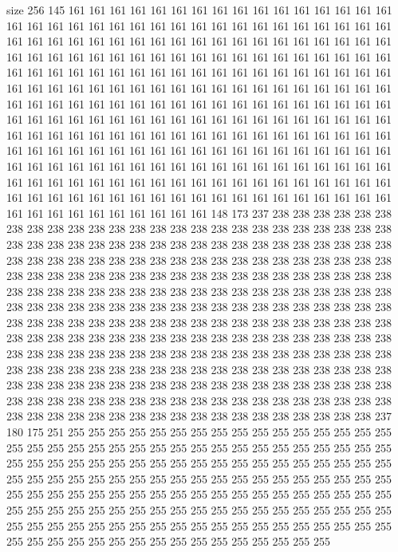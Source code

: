 size 256
145 161 161 161 161 161 161 161 161 161 161 161 161 161 161 161 161 161 161 161
161 161 161 161 161 161 161 161 161 161 161 161 161 161 161 161 161 161 161 161
161 161 161 161 161 161 161 161 161 161 161 161 161 161 161 161 161 161 161 161
161 161 161 161 161 161 161 161 161 161 161 161 161 161 161 161 161 161 161 161
161 161 161 161 161 161 161 161 161 161 161 161 161 161 161 161 161 161 161 161
161 161 161 161 161 161 161 161 161 161 161 161 161 161 161 161 161 161 161 161
161 161 161 161 161 161 161 161 161 161 161 161 161 161 161 161 161 161 161 161
161 161 161 161 161 161 161 161 161 161 161 161 161 161 161 161 161 161 161 161
161 161 161 161 161 161 161 161 161 161 161 161 161 161 161 161 161 161 161 161
161 161 161 161 161 161 161 161 161 161 161 161 161 161 161 161 161 161 161 161
161 161 161 161 161 161 161 161 161 161 161 161 161 161 161 161 161 161 161 161
161 161 161 161 161 161 161 161 161 161 161 161 161 161 161 161 161 161 161 161
161 161 161 161 161 161 161 161 161 161 161 161 161 161 161 148 173 237 238 238
238 238 238 238 238 238 238 238 238 238 238 238 238 238 238 238 238 238 238 238
238 238 238 238 238 238 238 238 238 238 238 238 238 238 238 238 238 238 238 238
238 238 238 238 238 238 238 238 238 238 238 238 238 238 238 238 238 238 238 238
238 238 238 238 238 238 238 238 238 238 238 238 238 238 238 238 238 238 238 238
238 238 238 238 238 238 238 238 238 238 238 238 238 238 238 238 238 238 238 238
238 238 238 238 238 238 238 238 238 238 238 238 238 238 238 238 238 238 238 238
238 238 238 238 238 238 238 238 238 238 238 238 238 238 238 238 238 238 238 238
238 238 238 238 238 238 238 238 238 238 238 238 238 238 238 238 238 238 238 238
238 238 238 238 238 238 238 238 238 238 238 238 238 238 238 238 238 238 238 238
238 238 238 238 238 238 238 238 238 238 238 238 238 238 238 238 238 238 238 238
238 238 238 238 238 238 238 238 238 238 238 238 238 238 238 238 238 238 238 238
238 238 238 238 238 238 238 238 238 238 238 238 238 238 238 238 238 238 238 238
238 238 238 238 238 238 238 238 238 238 237 180 175 251 255 255 255 255 255 255
255 255 255 255 255 255 255 255 255 255 255 255 255 255 255 255 255 255 255 255
255 255 255 255 255 255 255 255 255 255 255 255 255 255 255 255 255 255 255 255
255 255 255 255 255 255 255 255 255 255 255 255 255 255 255 255 255 255 255 255
255 255 255 255 255 255 255 255 255 255 255 255 255 255 255 255 255 255 255 255
255 255 255 255 255 255 255 255 255 255 255 255 255 255 255 255 255 255 255 255
255 255 255 255 255 255 255 255 255 255 255 255 255 255 255 255 255 255 255 255
255 255 255 255 255 255 255 255 255 255 255 255 255 255 255 255 255 255 255 255
